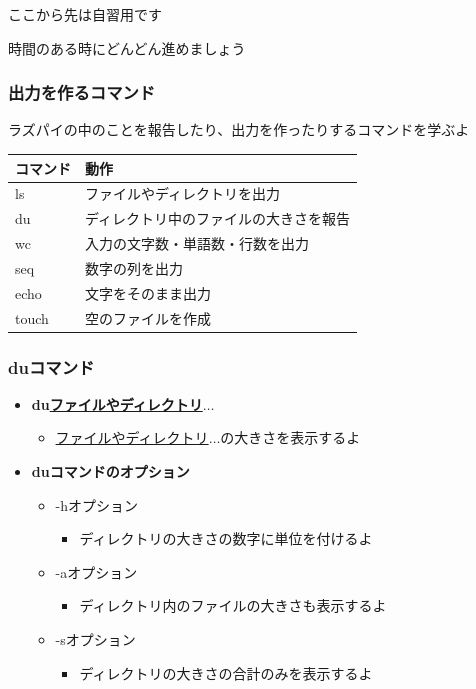 \documentclass[slide03.tex]{subfiles}
\begin{document}
\begin{frame}
\center
ここから先は自習用です

時間のある時にどんどん進めましょう

\end{frame}

\begin{frame}
    \frametitle{出力を作るコマンド}
    ラズパイの中のことを報告したり、出力を作ったりするコマンドを学ぶよ\\
    \vspace{\zh}
    \begin{tabular}{ll}
        コマンド  & 動作                                \\ \hline
        ls       & ファイルやディレクトリを出力          \\
        du       & ディレクトリ中のファイルの大きさを報告 \\
        wc       & 入力の文字数・単語数・行数を出力      \\
        seq      & 数字の列を出力                        \\
        echo     & 文字をそのまま出力                    \\
        touch    & 空のファイルを作成                    \\\hline
    \end{tabular}
\end{frame}

\begin{frame}
    \frametitle{duコマンド}
    \begin{itemize}
        \item {\bf du\textvisiblespace\underline{ファイルやディレクトリ}$\ldots$}
        \begin{itemize}
            \small
            \item[] \underline{ファイルやディレクトリ}$\ldots$の大きさを表示するよ
        \end{itemize}
        \item {\bf duコマンドのオプション}
        \begin{itemize}
            \small
            \item  -hオプション
           \begin{itemize}
                \item[] ディレクトリの大きさの数字に単位を付けるよ
            \end{itemize}
            \item -aオプション
            \begin{itemize}
               \item[] ディレクトリ内のファイルの大きさも表示するよ
            \end{itemize}
            \item -sオプション
            \begin{itemize}
                \item[] ディレクトリの大きさの合計のみを表示するよ
            \end{itemize}
        \end{itemize}
    \end{itemize}
\end{frame}
\end{document}
